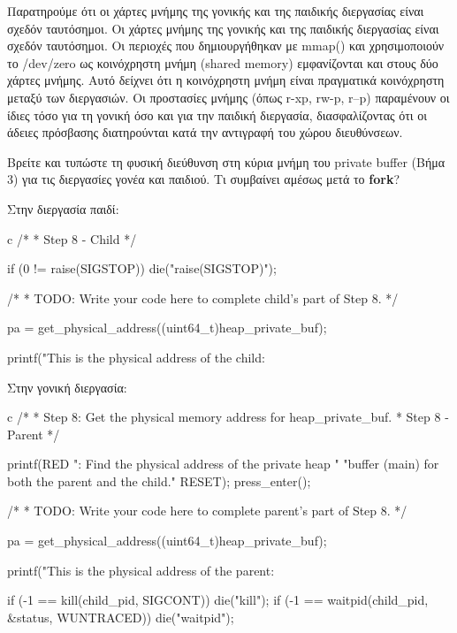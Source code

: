 \documentclass[12pt]{article}
\begin{document}
Παρατηρούμε ότι οι χάρτες μνήμης της γονικής και της παιδικής διεργασίας είναι σχεδόν 
ταυτόσημοι. 
Οι χάρτες μνήμης της γονικής και της παιδικής διεργασίας είναι σχεδόν ταυτόσημοι. 
Οι περιοχές που δημιουργήθηκαν με mmap() και χρησιμοποιούν το /dev/zero ως 
κοινόχρηστη μνήμη (shared memory) εμφανίζονται και στους δύο χάρτες μνήμης. 
Αυτό δείχνει ότι η κοινόχρηστη μνήμη είναι πραγματικά κοινόχρηστη μεταξύ 
των διεργασιών. 
Οι προστασίες μνήμης (όπως r-xp, rw-p, r--p) παραμένουν οι ίδιες τόσο για τη 
γονική όσο και για την παιδική διεργασία, διασφαλίζοντας ότι οι άδειες 
πρόσβασης διατηρούνται κατά την αντιγραφή του χώρου διευθύνσεων.

\pagebreak

\begin{question}
Βρείτε και τυπώστε τη φυσική διεύθυνση στη κύρια μνήμη του private buffer (Βήμα
3) για τις διεργασίες γονέα και παιδιού. Τι συμβαίνει αμέσως μετά το \textbf{fork}?
\end{question}

Στην διεργασία παιδί:

\begin{codeless}{c}
    /*
    * Step 8 - Child
    */
   
   if (0 != raise(SIGSTOP))
   {
       die("raise(SIGSTOP)");
   }
   
   /*
    * TODO: Write your code here to complete child's part of Step 8.
    */
   
   pa = get_physical_address((uint64_t)heap_private_buf);
   
   printf("This is the physical address of the child: %
\end{codeless}

Στην γονική διεργασία:

\begin{codeless}{c}
    /*
    * Step 8: Get the physical memory address for heap_private_buf.
    * Step 8 - Parent
    */
   
   printf(RED ": Find the physical address of the private heap "
       "buffer (main) for both the parent and the child.\n" RESET);
   press_enter();

   /*
    * TODO: Write your code here to complete parent's part of Step 8.
    */
   
   pa = get_physical_address((uint64_t)heap_private_buf);
       
   printf("This is the physical address of the parent: %

   if (-1 == kill(child_pid, SIGCONT))
   {
       die("kill");
   }
   if (-1 == waitpid(child_pid, &status, WUNTRACED))
   {
       die("waitpid");
   }

\end{codeless}
\end{document}
